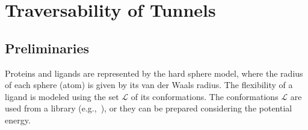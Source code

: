 \documentclass[usletter, 10pt, conference]{ieeeconf} %
\def\L{\mathcal{L}}
\begin{document}






\section{Traversability of Tunnels}

\subsection{Preliminaries}

Proteins and ligands are represented by the hard sphere model, where the radius of each sphere (atom) is given by its van der Waals radius.
The flexibility of a ligand is modeled using the set $\L$ of its conformations.
The conformations $\L$ are used from a library (e.g.,~\cite{dunbrack}), or they can be prepared considering the potential energy.
\end{document}
